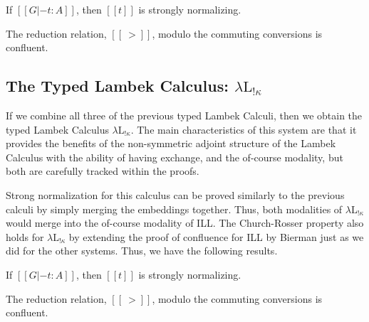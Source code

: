 \documentclass{entcs}
\begin{document}
\begin{thm}
  \label{corollary:strong_normalization_lambdaLk}
  If $[[G |- t : A]]$, then $[[t]]$ is strongly normalizing.
\end{thm}

\begin{thm}[Confluence]
  \label{thm:confluence-lambdaLk}
  The reduction relation, $[[~>]]$, modulo the commuting conversions
  is confluent.
\end{thm}

\subsection{The Typed Lambek Calculus: $\lambda\text{L}_{!\kappa}$}
\label{subsec:the_typed_lambek_calculus:lambda-l-!kappa}
If we combine all three of the previous typed Lambek Calculi, then we
obtain the typed Lambek Calculus $\lambda\text{L}_{!\kappa}$.  The
main characteristics of this system are that it provides the benefits
of the non-symmetric adjoint structure of the Lambek Calculus with the
ability of having exchange, and the of-course modality, but both are
carefully tracked within the proofs.

Strong normalization for this calculus can be proved similarly to the
previous calculi by simply merging the embeddings together.  Thus,
both modalities of $\lambda\text{L}_{!\kappa}$ would merge into the
of-course modality of ILL.  The Church-Rosser property also holds for
$\lambda\text{L}_{!\kappa}$ by extending the proof of confluence for
ILL by Bierman \cite{Bierman:1994} just as we did for the other
systems.  Thus, we have the following results.

\begin{thm}
  \label{theorem:strong_normalization_lambdaL!k}
  If $[[G |- t : A]]$, then $[[t]]$ is strongly normalizing.
\end{thm}

\begin{thm}[Confluence]
  \label{thm:confluence-lambdaL!k}
  The reduction relation, $[[~>]]$, modulo the commuting conversions
  is confluent.
\end{thm}
\end{document}
